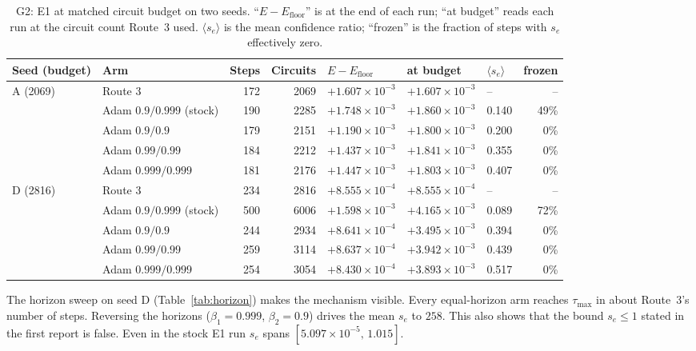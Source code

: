 \documentclass[aps,pra,reprint,superscriptaddress,nofootinbib]{revtex4-2}
\newcommand{\Efloor}{E_{\mathrm{floor}}}
\begin{document}
\begin{table}[t]
\caption{G2: E1 at matched circuit budget on two seeds. ``$E-\Efloor$'' is at the end of each
run; ``at budget'' reads each run at the circuit count Route~3 used. $\langle s_e\rangle$ is the
mean confidence ratio; ``frozen'' is the fraction of steps with $s_e$ effectively zero.}
\label{tab:g2}
\begin{ruledtabular}
\begin{tabular}{llrrlllr}
Seed (budget) & Arm & Steps & Circuits & $E-\Efloor$ & at budget & $\langle s_e\rangle$ & frozen \\
\midrule
A (2069) & Route 3 & 172 & 2069 & $+1.607\times10^{-3}$ & $+1.607\times10^{-3}$ & -- & -- \\
 & Adam $0.9/0.999$ (stock) & 190 & 2285 & $+1.748\times10^{-3}$ & $+1.860\times10^{-3}$ & 0.140 & 49\% \\
 & Adam $0.9/0.9$ & 179 & 2151 & $+1.190\times10^{-3}$ & $+1.800\times10^{-3}$ & 0.200 & 0\% \\
 & Adam $0.99/0.99$ & 184 & 2212 & $+1.437\times10^{-3}$ & $+1.841\times10^{-3}$ & 0.355 & 0\% \\
 & Adam $0.999/0.999$ & 181 & 2176 & $+1.447\times10^{-3}$ & $+1.803\times10^{-3}$ & 0.407 & 0\% \\
\midrule
D (2816) & Route 3 & 234 & 2816 & $+8.555\times10^{-4}$ & $+8.555\times10^{-4}$ & -- & -- \\
 & Adam $0.9/0.999$ (stock) & 500 & 6006 & $+1.598\times10^{-3}$ & $+4.165\times10^{-3}$ & 0.089 & 72\% \\
 & Adam $0.9/0.9$ & 244 & 2934 & $+8.641\times10^{-4}$ & $+3.495\times10^{-3}$ & 0.394 & 0\% \\
 & Adam $0.99/0.99$ & 259 & 3114 & $+8.637\times10^{-4}$ & $+3.942\times10^{-3}$ & 0.439 & 0\% \\
 & Adam $0.999/0.999$ & 254 & 3054 & $+8.430\times10^{-4}$ & $+3.893\times10^{-3}$ & 0.517 & 0\% \\
\end{tabular}
\end{ruledtabular}
\end{table}

The horizon sweep on seed D (Table~\ref{tab:horizon}) makes the mechanism visible. Every
equal-horizon arm reaches $\tau_{\max}$ in about Route~3's number of steps. Reversing the
horizons ($\beta_1=0.999$, $\beta_2=0.9$) drives the mean $s_e$ to $258$. This also shows that
the bound $s_e\le1$ stated in the first report is false. Even in the stock E1 run $s_e$ spans
$[5.097\times10^{-5},\,1.015]$.
\end{document}
